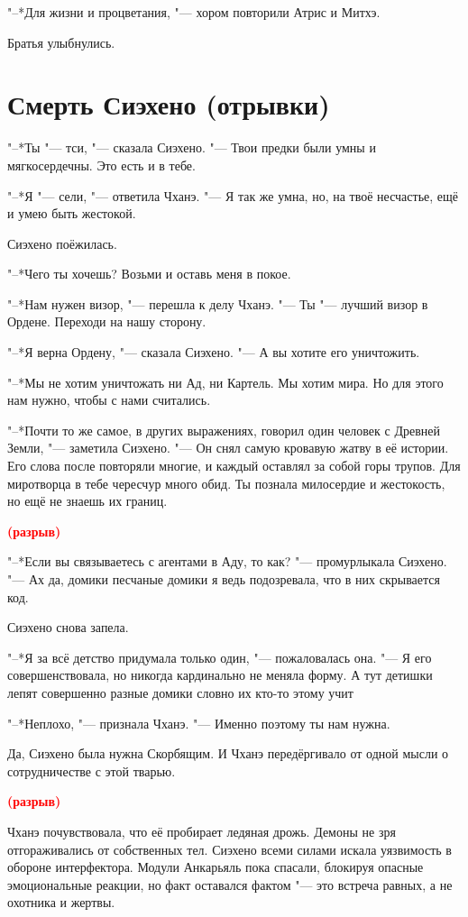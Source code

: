 \documentclass[a4paper,10pt]{book}
\newcommand{\ldotst}{\so{...}\xspace}
\newcommand{\spacing}{\textcolor{red}{\textbf{(разрыв)}}}
\begin{document}
"--*Для жизни и процветания, "--- хором повторили Атрис и Митхэ.

Братья улыбнулись.

\section{Смерть Сиэхено (отрывки)}

"--*Ты "--- тси, "--- сказала Сиэхено. "--- Твои предки были умны и 
мягкосердечны. Это есть и в тебе.

"--*Я "--- сели, "--- ответила Чханэ. "--- Я так же умна, но, на твоё 
несчастье, ещё и умею быть жестокой.

Сиэхено поёжилась.

"--*Чего ты хочешь? Возьми и оставь меня в покое.

"--*Нам нужен визор, "--- перешла к делу Чханэ. "--- Ты "--- лучший визор в 
Ордене. Переходи на нашу сторону.

"--*Я верна Ордену, "--- сказала Сиэхено. "--- А вы хотите его уничтожить.

"--*Мы не хотим уничтожать ни Ад, ни Картель. Мы хотим мира. Но для этого нам 
нужно, чтобы с нами считались.

"--*Почти то же самое, в других выражениях, говорил один человек с Древней 
Земли, "--- заметила Сиэхено. "--- Он снял самую кровавую жатву в её истории. 
Его слова после повторяли многие, и каждый оставлял за собой горы трупов. Для 
миротворца в тебе чересчур много обид. Ты познала милосердие и жестокость, но 
ещё не знаешь их границ.

\spacing

"--*Если вы связываетесь с агентами в Аду, то как? "--- промурлыкала Сиэхено. 
"--- Ах да, домики\ldotst песчаные домики\ldotst я ведь подозревала, что в них 
скрывается код.

Сиэхено снова запела.

"--*Я за всё детство придумала только один, "--- пожаловалась она. "--- Я его 
совершенствовала, но никогда кардинально не меняла форму. А тут детишки лепят 
совершенно разные домики\ldotst словно их кто-то этому учит\ldotst

"--*Неплохо, "--- признала Чханэ. "--- Именно поэтому ты нам нужна.

Да, Сиэхено была нужна Скорбящим. И Чханэ передёргивало от одной мысли о 
сотрудничестве с этой тварью.

\spacing

Чханэ почувствовала, что её пробирает ледяная дрожь. Демоны не зря 
отгораживались от собственных тел. Сиэхено всеми силами искала уязвимость в 
обороне интерфектора. Модули Анкарьяль пока спасали, блокируя опасные 
эмоциональные реакции, но факт оставался фактом "--- это встреча равных, а не 
охотника и жертвы.
\end{document}
